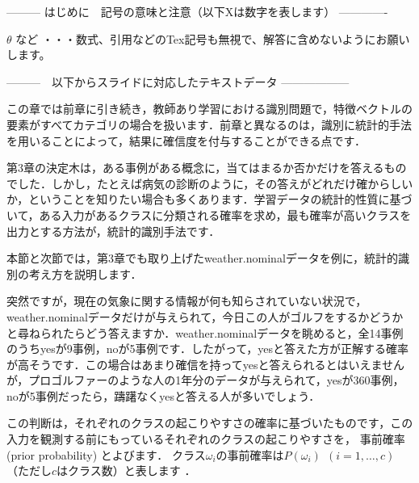--------- はじめに　記号の意味と注意（以下Xは数字を表します） -------------

$\theta$ など       ・・・数式、引用などのTex記号も無視で、解答に含めないようにお願いします。
\cite{mitchell97}

---------　以下からスライドに対応したテキストデータ ------------------


この章では前章に引き続き，教師あり学習における識別問題で，特徴ベクトルの要素がすべてカテゴリの場合を扱います．前章と異なるのは，識別に統計的手法を用いることによって，結果に確信度を付与することができる点です．


第3章の決定木は，ある事例がある概念に，当てはまるか否かだけを答えるものでした．しかし，たとえば病気の診断のように，その答えがどれだけ確からしいか，ということを知りたい場合も多くあります．学習データの統計的性質に基づいて，ある入力があるクラスに分類される確率を求め，最も確率が高いクラスを出力とする方法が，統計的識別手法です．

本節と次節では，第3章でも取り上げたweather.nominalデータを例に，統計的識別の考え方を説明します．


突然ですが，現在の気象に関する情報が何も知らされていない状況で，weather.nominalデータだけが与えられて，今日この人がゴルフをするかどうかと尋ねられたらどう答えますか．weather.nominalデータを眺めると，全14事例のうちyesが9事例，noが5事例です．したがって，yesと答えた方が正解する確率が高そうです．この場合はあまり確信を持ってyesと答えられるとはいえませんが，プロゴルファーのような人の1年分のデータが与えられて，yesが360事例，noが5事例だったら，躊躇なくyesと答える人が多いでしょう．

この判断は，それぞれのクラスの起こりやすさの確率に基づいたものです，この入力を観測する前にもっているそれぞれのクラスの起こりやすさを，
事前確率 (prior probability) 
とよびます．
クラス$\omega_i$の事前確率は$P(\omega_i) ~~ (i=1,\dots,c)$ （ただし$c$はクラス数）と表します
．

